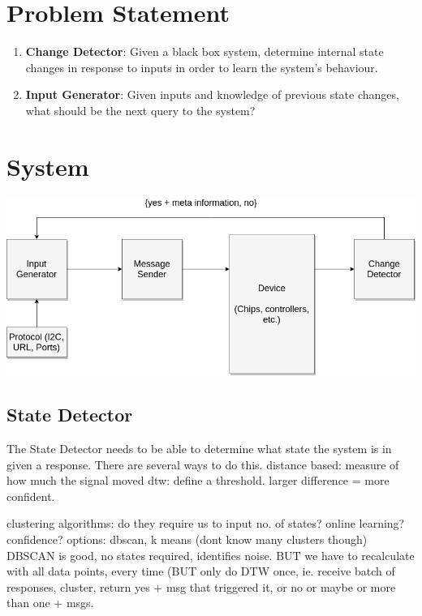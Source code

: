 \documentclass[11pt, a4paper]{article}
\begin{document}
\section*{Problem Statement} 

\begin{enumerate}
    \item \textbf{Change Detector}: Given a black box system, determine internal state changes in response to inputs in order to learn the system's behaviour.
    \item \textbf{Input Generator}: Given inputs and knowledge of previous state changes, what should be the next query to the system?
\end{enumerate}

\section*{System}

\includegraphics[scale=0.5]{Fuzzer.png}

\subsection*{State Detector}
The State Detector needs to be able to determine what state the system is in given a response.
There are several ways to do this.
distance based: measure of how much the signal moved
dtw: define a threshold. larger difference = more confident.

clustering algorithms: do they require us to input no. of states? online learning? confidence?
options: dbscan, k means (dont know many clusters though)
DBSCAN is good, no states required, identifies noise. BUT we have to recalculate with all data points, every time (BUT only do DTW once, ie. 
receive batch of responses, cluster, return yes + msg that triggered it, or no or maybe or more than one + msgs.
\end{document}
